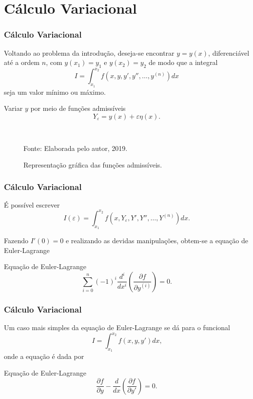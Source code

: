 \documentclass{beamer}
\newcommand{\fonte}[1]{
	\begin{center}
		\footnotesize Fonte: #1
	\end{center}
}
\newcommand{\fonteElaboradaPeloAutor}{
	\fonte{Elaborada pelo autor, 2019.}
}
\begin{document}
	\section{Cálculo Variacional}
	
	\begin{frame}
		\frametitle{Cálculo Variacional}
		\justify
		
		Voltando ao problema da introdução, deseja-se encontrar $y=y(x)$, diferenciável até a ordem $n$, com $y(x_1)=y_1$ e $y(x_2)=y_2$ de modo que a integral
		$$
			I = \int_{x_1}^{x_2} f(x, y, y', y'', \dots, y^{(n)})dx
		$$
		seja um valor mínimo ou máximo.
		\vspace{10pt}
		\pause
		
		Variar $y$ por meio de funções admissíveis
		$$
			Y_{\varepsilon}=y(x)+\varepsilon\eta(x)
			\text{.}
		$$
	\end{frame}
	
	\encapsulateBackgroundLessFrames
	{
		\begin{frame}
			\begin{figure}
				\caption{Representação gráfica das funções admissíveis.}
				\begin{center}
					\resizebox{0.5\textwidth}{0.5\textwidth}{
						
					}\\
					\fonteElaboradaPeloAutor
				\end{center}
				\label{fig:func_approx}
			\end{figure}
		\end{frame}
	}

	\begin{frame}
		\frametitle{Cálculo Variacional}
		\justify
		
		É possível escrever
		$$
			I(\varepsilon) = \int_{x_1}^{x_2} f(x, Y_{\varepsilon}, Y', Y'', \dots, Y^{(n)})dx
			\text{.}
		$$
		\pause
		
		Fazendo $I'(0)=0$ e realizando as devidas manipulações, obtem-se a equação de Euler-Lagrange
		\begin{block}{Equação de Euler-Lagrange}
			$$
				\sum_{i=0}^n (-1)^i\frac{d^i}{dx^i}\left (
					\frac{\partial f}{\partial y^{(i)}}
				\right )
				= 0
				\text{.}
			$$
		\end{block}
	\end{frame}
	
	\begin{frame}
		\frametitle{Cálculo Variacional}
		\justify

		Um caso mais simples da equação de Euler-Lagrange se dá para o funcional
		$$
			I=\int_{x_1}^{x_2} f(x, y, y')dx
			\text{,}
		$$
		onde a equação é dada por
		
		\begin{block}{Equação de Euler-Lagrange}
			$$
				\frac{\partial f}{\partial y} - \frac{d}{dx} \left ( \frac{\partial f}{\partial y'} \right )=0 \text{.}
			$$
		\end{block}
	\end{frame}
	
\end{document}
